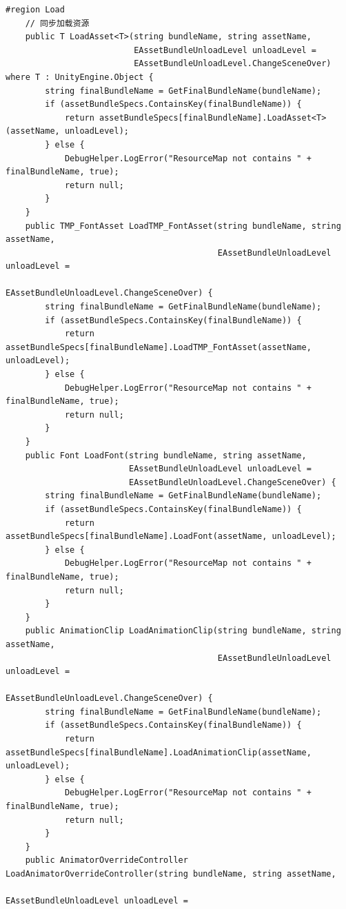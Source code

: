 \documentclass[9pt, b5paper]{article}
\begin{document}
\begin{verbatim}
#region Load
    // 同步加载资源
    public T LoadAsset<T>(string bundleName, string assetName, 
                          EAssetBundleUnloadLevel unloadLevel = 
                          EAssetBundleUnloadLevel.ChangeSceneOver) where T : UnityEngine.Object {
        string finalBundleName = GetFinalBundleName(bundleName);
        if (assetBundleSpecs.ContainsKey(finalBundleName)) {
            return assetBundleSpecs[finalBundleName].LoadAsset<T>(assetName, unloadLevel);
        } else {
            DebugHelper.LogError("ResourceMap not contains " + finalBundleName, true);
            return null;
        }
    }
    public TMP_FontAsset LoadTMP_FontAsset(string bundleName, string assetName, 
                                           EAssetBundleUnloadLevel unloadLevel = 
                                           EAssetBundleUnloadLevel.ChangeSceneOver) {
        string finalBundleName = GetFinalBundleName(bundleName);
        if (assetBundleSpecs.ContainsKey(finalBundleName)) {
            return assetBundleSpecs[finalBundleName].LoadTMP_FontAsset(assetName, unloadLevel);
        } else {
            DebugHelper.LogError("ResourceMap not contains " + finalBundleName, true);
            return null;
        }
    }
    public Font LoadFont(string bundleName, string assetName, 
                         EAssetBundleUnloadLevel unloadLevel = 
                         EAssetBundleUnloadLevel.ChangeSceneOver) {
        string finalBundleName = GetFinalBundleName(bundleName);
        if (assetBundleSpecs.ContainsKey(finalBundleName)) {
            return assetBundleSpecs[finalBundleName].LoadFont(assetName, unloadLevel);
        } else {
            DebugHelper.LogError("ResourceMap not contains " + finalBundleName, true);
            return null;
        }
    }
    public AnimationClip LoadAnimationClip(string bundleName, string assetName, 
                                           EAssetBundleUnloadLevel unloadLevel = 
                                           EAssetBundleUnloadLevel.ChangeSceneOver) {
        string finalBundleName = GetFinalBundleName(bundleName);
        if (assetBundleSpecs.ContainsKey(finalBundleName)) {
            return assetBundleSpecs[finalBundleName].LoadAnimationClip(assetName, unloadLevel);
        } else {
            DebugHelper.LogError("ResourceMap not contains " + finalBundleName, true);
            return null;
        }
    }
    public AnimatorOverrideController LoadAnimatorOverrideController(string bundleName, string assetName, 
                                                                     EAssetBundleUnloadLevel unloadLevel = 

\end{verbatim}
\end{document}
